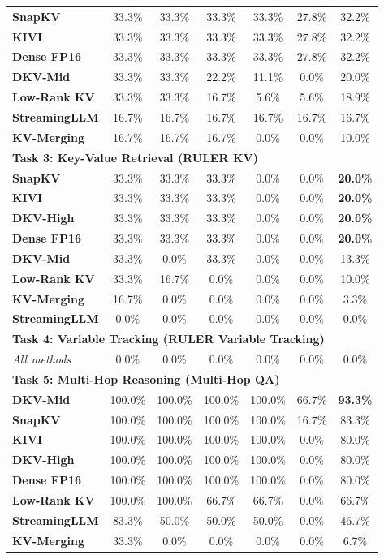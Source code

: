 \documentclass[10pt]{article}
\theoremstyle{definition}
\begin{document}
\begin{table}[h]
\begin{tabular}{lcccccc}
\textbf{SnapKV} & 33.3\% & 33.3\% & 33.3\% & 33.3\% & 27.8\% & 32.2\% \\
\textbf{KIVI} & 33.3\% & 33.3\% & 33.3\% & 33.3\% & 27.8\% & 32.2\% \\
\textbf{Dense FP16} & 33.3\% & 33.3\% & 33.3\% & 33.3\% & 27.8\% & 32.2\% \\
\textbf{DKV-Mid} & 33.3\% & 33.3\% & 22.2\% & 11.1\% & 0.0\% & 20.0\% \\
\textbf{Low-Rank KV} & 33.3\% & 33.3\% & 16.7\% & 5.6\% & 5.6\% & 18.9\% \\
\textbf{StreamingLLM} & 16.7\% & 16.7\% & 16.7\% & 16.7\% & 16.7\% & 16.7\% \\
\textbf{KV-Merging} & 16.7\% & 16.7\% & 16.7\% & 0.0\% & 0.0\% & 10.0\% \\
\midrule
\multicolumn{7}{l}{\textbf{Task 3: Key-Value Retrieval (RULER KV)}} \\
\textbf{SnapKV} & 33.3\% & 33.3\% & 33.3\% & 0.0\% & 0.0\% & \textbf{20.0\%} \\
\textbf{KIVI} & 33.3\% & 33.3\% & 33.3\% & 0.0\% & 0.0\% & \textbf{20.0\%} \\
\textbf{DKV-High} & 33.3\% & 33.3\% & 33.3\% & 0.0\% & 0.0\% & \textbf{20.0\%} \\
\textbf{Dense FP16} & 33.3\% & 33.3\% & 33.3\% & 0.0\% & 0.0\% & \textbf{20.0\%} \\
\textbf{DKV-Mid} & 33.3\% & 0.0\% & 33.3\% & 0.0\% & 0.0\% & 13.3\% \\
\textbf{Low-Rank KV} & 33.3\% & 16.7\% & 0.0\% & 0.0\% & 0.0\% & 10.0\% \\
\textbf{KV-Merging} & 16.7\% & 0.0\% & 0.0\% & 0.0\% & 0.0\% & 3.3\% \\
\textbf{StreamingLLM} & 0.0\% & 0.0\% & 0.0\% & 0.0\% & 0.0\% & 0.0\% \\
\midrule
\multicolumn{7}{l}{\textbf{Task 4: Variable Tracking (RULER Variable Tracking)}} \\
\textit{All methods} & 0.0\% & 0.0\% & 0.0\% & 0.0\% & 0.0\% & 0.0\% \\
\midrule
\multicolumn{7}{l}{\textbf{Task 5: Multi-Hop Reasoning (Multi-Hop QA)}} \\
\textbf{DKV-Mid} & 100.0\% & 100.0\% & 100.0\% & 100.0\% & 66.7\% & \textbf{93.3\%} \\
\textbf{SnapKV} & 100.0\% & 100.0\% & 100.0\% & 100.0\% & 16.7\% & 83.3\% \\
\textbf{KIVI} & 100.0\% & 100.0\% & 100.0\% & 100.0\% & 0.0\% & 80.0\% \\
\textbf{DKV-High} & 100.0\% & 100.0\% & 100.0\% & 100.0\% & 0.0\% & 80.0\% \\
\textbf{Dense FP16} & 100.0\% & 100.0\% & 100.0\% & 100.0\% & 0.0\% & 80.0\% \\
\textbf{Low-Rank KV} & 100.0\% & 100.0\% & 66.7\% & 66.7\% & 0.0\% & 66.7\% \\
\textbf{StreamingLLM} & 83.3\% & 50.0\% & 50.0\% & 50.0\% & 0.0\% & 46.7\% \\
\textbf{KV-Merging} & 33.3\% & 0.0\% & 0.0\% & 0.0\% & 0.0\% & 6.7\% \\
\bottomrule
\end{tabular}
\end{table}
\end{document}
